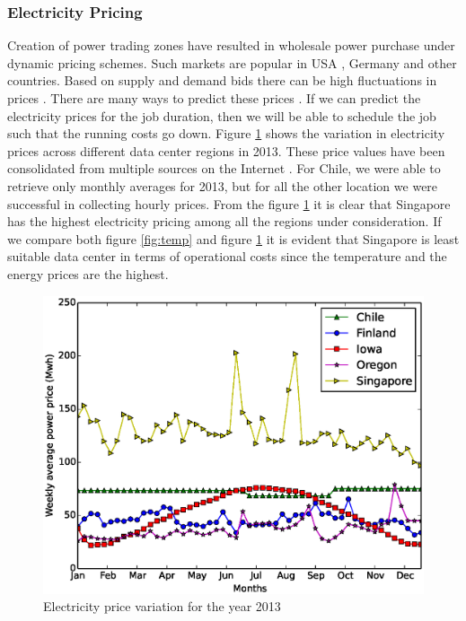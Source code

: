 \documentclass[conference,12pt]{IEEEtran}
\begin{document}
\subsubsection{Electricity Pricing} \label{sec:elec}
Creation of power trading zones have resulted in wholesale power purchase under dynamic pricing schemes. Such markets are popular in USA \cite{elecusa}, Germany \cite{elecgermany} and other countries. Based on supply and demand bids there can be high fluctuations in prices \cite{benini2002day}. There are many ways to predict these prices \cite{contreras2003arima} \cite{garcia2005garch}. If we can predict the electricity prices for the job duration, then we will be able to schedule the job such that the running costs go down. Figure \ref{fig:elec} shows the variation in electricity prices across different data center regions in 2013. These price values have been consolidated from multiple sources on the Internet \cite{singelec} \cite{finelec} \cite{uselec}. For Chile, we were able to retrieve only monthly averages for 2013, but for all the other location we were successful in collecting hourly prices. From the figure \ref{fig:elec} it is clear that Singapore has the highest electricity pricing among all the regions under consideration. If we compare both figure \ref{fig:temp} and figure \ref{fig:elec} it is evident that Singapore is least suitable data center in terms of operational costs since the temperature and the energy prices are the highest. 

\begin{figure}[H]
\includegraphics[scale=0.45]{elec}
\caption{ Electricity price variation for the year 2013}
 \label{fig:elec}
\end{figure}
\end{document}
